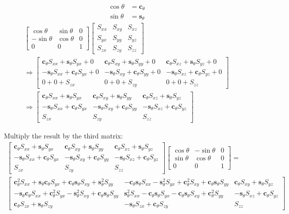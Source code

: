 \documentclass{article}
\def\ct{\mathbf{c}_{\theta}}
\def\st{\mathbf{s}_{\theta}}
\def\sxx{S_{xx}}
\def\sxy{S_{xy}}
\def\sxz{S_{xz}}
\def\syx{S_{yx}}
\def\syy{S_{yy}}
\def\syz{S_{yz}}
\def\szx{S_{zx}}
\def\szy{S_{zy}}
\def\szz{S_{zz}}
\begin{document}
\begin{align}
    \cos \theta &= \ct \\
    \sin \theta &= \st 
\end{align}
%
\begin{multline}
    \begin{bmatrix}
        \cos \theta & \sin \theta & 0\\
        -\sin \theta & \cos \theta & 0 \\
        0 & 0 & 1
    \end{bmatrix}
    \begin{bmatrix}
    S_{xx} & S_{xy} & S_{xz} \\
    S_{yx} & S_{yy} & S_{yz} \\
    S_{zx} & S_{zy} & S_{zz}
    \end{bmatrix}
    \\
    \Longrightarrow
    \begin{bmatrix}
        \ct\sxx + \st\syx + 0 & \ct\sxy + \st\syy + 0 & \ct\sxz + \st\syz + 0 \\
        -\st\sxx + \ct\syx + 0 & -\st\sxy + \ct\syy + 0 & -\st\sxz + \ct\syz + 0 \\
        0 + 0 + \szx & 0 + 0 + \szy & 0 + 0 + \szz
    \end{bmatrix}
    \\
    \Longrightarrow
    \begin{bmatrix}
        \ct\sxx + \st\syx & \ct\sxy + \st\syy & \ct\sxz + \st\syz \\
        -\st\sxx + \ct\syx & -\st\sxy + \ct\syy & -\st\sxz + \ct\syz \\
        \szx & \szy & \szz
    \end{bmatrix}
\end{multline}

Multiply the result by the third matrix:
\begin{multline}
    \begin{bmatrix}
        \ct\sxx + \st\syx & \ct\sxy + \st\syy & \ct\sxz + \st\syz \\
        -\st\sxx + \ct\syx & -\st\sxy + \ct\syy & -\st\sxz + \ct\syz \\
        \szx & \szy & \szz
    \end{bmatrix}
    \begin{bmatrix}
        \cos \theta & -\sin \theta & 0\\
        \sin \theta & \cos \theta & 0 \\
        0 & 0 & 1
    \end{bmatrix}
    = 
    \\
    \begin{bmatrix}
        \ct^2\sxx + \st\ct\syx + \ct\st\sxy + \st^2\syy & 
        -\ct\st\sxx - \st^2\syx + \ct^2\sxy + \ct\st\syy & 
        \ct\sxy + \st\syz \\
        -\st\ct\sxx + \ct^2\syx - \st^2\sxy + \ct\st\syy & \st^2\sxx - \ct\st\syx - \ct\st\sxy + \ct^2\syy & -\st\sxz + \ct\syz \\
        \ct\szx + \st\szy & -\st\szx + \ct\szy & \szz
    \end{bmatrix}
    \label{eq:something}
\end{multline}
\end{document}
